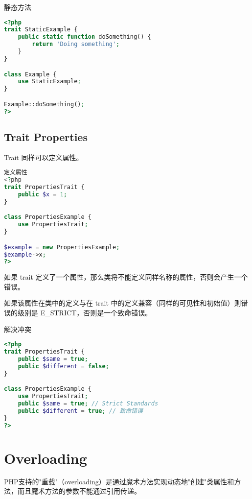 \begin{example}
静态方法
\begin{lstlisting}[language=PHP]
<?php
trait StaticExample {
    public static function doSomething() {
        return 'Doing something';
    }
}

class Example {
    use StaticExample;
}

Example::doSomething();
?>
\end{lstlisting}
\end{example}




\section{Trait Properties}

Trait 同样可以定义属性。

\begin{lstlisting}[language=PHP]
定义属性
<?php
trait PropertiesTrait {
    public $x = 1;
}

class PropertiesExample {
    use PropertiesTrait;
}

$example = new PropertiesExample;
$example->x;
?>
\end{lstlisting}

\begin{compactitem}
\item 如果 trait 定义了一个属性，那么类将不能定义同样名称的属性，否则会产生一个错误。
\item 如果该属性在类中的定义与在 trait 中的定义兼容（同样的可见性和初始值）则错误的级别是 E\_STRICT，否则是一个致命错误。
\end{compactitem}

\begin{example}
解决冲突
\begin{lstlisting}[language=PHP]
<?php
trait PropertiesTrait {
    public $same = true;
    public $different = false;
}

class PropertiesExample {
    use PropertiesTrait;
    public $same = true; // Strict Standards
    public $different = true; // 致命错误
}
?>
\end{lstlisting}
\end{example}


\chapter{Overloading}



PHP支持的"重载"（overloading）是通过魔术方法实现动态地"创建"类属性和方法，而且魔术方法的参数不能通过引用传递。

